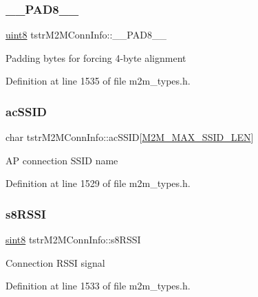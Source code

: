 \subsubsection{\texorpdfstring{\+\_\+\+\_\+\+P\+A\+D8\+\_\+\+\_\+}{\_\_PAD8\_\_}}
{\footnotesize\ttfamily \hyperlink{group__DataT_ga4df709a77647e870bbf1d955b8edc9a6}{uint8} tstr\+M2\+M\+Conn\+Info\+::\+\_\+\+\_\+\+P\+A\+D8\+\_\+\+\_\+}

Padding bytes for forcing 4-\/byte alignment 

Definition at line 1535 of file m2m\+\_\+types.\+h.

\mbox{\label{structtstrM2MConnInfo_af19cf4e326663fde8038b30b6145758b}} 
\subsubsection{\texorpdfstring{ac\+S\+S\+ID}{acSSID}}
{\footnotesize\ttfamily char tstr\+M2\+M\+Conn\+Info\+::ac\+S\+S\+ID\mbox{[}\hyperlink{group__WlanDefines_gab2bd95c18ede2fbc07b44c5660cc0097}{M2\+M\+\_\+\+M\+A\+X\+\_\+\+S\+S\+I\+D\+\_\+\+L\+EN}\mbox{]}}

AP connection S\+S\+ID name 

Definition at line 1529 of file m2m\+\_\+types.\+h.

\mbox{\label{structtstrM2MConnInfo_ae043d4268b0e13c398bf001f7f8765ec}} 
\subsubsection{\texorpdfstring{s8\+R\+S\+SI}{s8RSSI}}
{\footnotesize\ttfamily \hyperlink{group__DataT_gae35f10ffd0ac8dd2bc3e794da9bdfbc7}{sint8} tstr\+M2\+M\+Conn\+Info\+::s8\+R\+S\+SI}

Connection R\+S\+SI signal 

Definition at line 1533 of file m2m\+\_\+types.\+h.

\mbox{\label{structtstrM2MConnInfo_af8eee50f79405eb3ad9d4be4eb73fc01}} 
